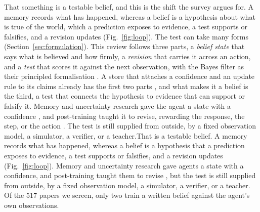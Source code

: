 \ifnature That something is a testable belief, and this is the shift the survey argues for. A memory records what has happened, whereas a belief is a hypothesis about what is true of the world, which a prediction exposes to evidence, a test supports or falsifies, and a revision updates (Fig.~\ref{fig:loop}). The test can take many forms (Section~\ref{sec:formulation}). This review follows three parts, a \emph{belief state} that says what is believed and how firmly, a \emph{revision} that carries it across an action, and a \emph{test} that scores it against the next observation, with the Bayes filter as their principled formalisation \citep{astrom1965optimal,kaelbling1998planning,thrun2005probabilistic,friston2010free}. A store that attaches a confidence and an update rule to its claims already has the first two parts \citep{zhang2024memory,luo2026storage}, and what makes it a belief is the third, a test that connects the hypothesis to evidence that can support or falsify it. Memory and uncertainty research gave the agent a state with a confidence \citep{park2023generative,shinn2023reflexion,lin2022teaching,kadavath2022language}, and post-training taught it to revise, rewarding the response, the step, or the action \citep{ouyang2022training,lightman2023lets,zhou2024archer,zhang2026reasoning}. The test is still supplied from outside, by a fixed observation model, a simulator, a verifier, or a teacher.\else That is a testable belief. A memory records what has happened, whereas a belief is a hypothesis that a prediction exposes to evidence, a test supports or falsifies, and a revision updates (Fig.~\ref{fig:loop}). Memory and uncertainty research gave agents a state with a confidence, and post-training taught them to revise \citep{zhang2024memory,luo2026storage,kadavath2022language,ouyang2022training,zhang2026reasoning}, but the test is still supplied from outside, by a fixed observation model, a simulator, a verifier, or a teacher. Of the 517 papers we screen, only two train a written belief against the agent's own observations.\fi

